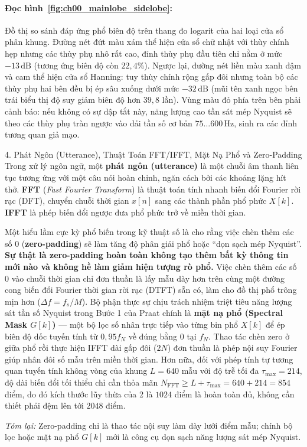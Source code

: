 \paragraph{Đọc hình~\ref{fig:ch00_mainlobe_sidelobe}:}
Đồ thị so sánh đáp ứng phổ biên độ trên thang đo logarit của hai loại cửa sổ phân khung. Đường nét đứt màu xám thể hiện cửa sổ chữ nhật với thùy chính hẹp nhưng các thùy phụ nhô rất cao, đỉnh thùy phụ đầu tiên chỉ nằm ở mức $-13\,\text{dB}$ (tương ứng biên độ còn $22{,}4\%$). Ngược lại, đường nét liền màu xanh đậm và cam thể hiện cửa sổ Hanning: tuy thùy chính rộng gấp đôi nhưng toàn bộ các thùy phụ hai bên đều bị ép sâu xuống dưới mức $-32\,\text{dB}$ (mũi tên xanh ngọc bên trái biểu thị độ suy giảm biên độ hơn $39{,}8$ lần). Vùng màu đỏ phía trên bên phải cảnh báo: nếu không có sự dập tắt này, năng lượng cao tần sát mép Nyquist sẽ theo các thùy phụ tràn ngược vào dải tần số cơ bản $75 \ldots 600\,\text{Hz}$, sinh ra các đỉnh tương quan giả mạo.

\begin{feynmanbox}{4. Phát Ngôn (Utterance), Thuật Toán FFT/IFFT, Mặt Nạ Phổ và Zero-Padding}
Trong xử lý ngôn ngữ, một \textbf{phát ngôn (utterance)} là một chuỗi âm thanh liên tục tương ứng với một câu nói hoàn chỉnh, ngăn cách bởi các khoảng lặng hít thở. \textbf{FFT} (\emph{Fast Fourier Transform}) là thuật toán tính nhanh biến đổi Fourier rời rạc (DFT), chuyển chuỗi thời gian $x[n]$ sang các thành phần phổ phức $X[k]$. \textbf{IFFT} là phép biến đổi ngược đưa phổ phức trở về miền thời gian.

Một hiểu lầm cực kỳ phổ biến trong kỹ thuật số là cho rằng việc chèn thêm các số 0 (\textbf{zero-padding}) sẽ làm tăng độ phân giải phổ hoặc ``dọn sạch mép Nyquist''. \textbf{Sự thật là zero-padding hoàn toàn không tạo thêm bất kỳ thông tin mới nào và không hề làm giảm hiện tượng rò phổ.} Việc chèn thêm các số 0 vào chuỗi thời gian chỉ đơn thuần là lấy mẫu dày hơn trên cùng một đường cong biến đổi Fourier thời gian rời rạc (DTFT) sẵn có, làm cho đồ thị phổ trông mịn hơn ($\Delta f = f_s / M$). Bộ phận thực sự chịu trách nhiệm triệt tiêu năng lượng sát tần số Nyquist trong Bước 1 của Praat chính là \textbf{mặt nạ phổ (Spectral Mask $G[k]$)} --- một bộ lọc số nhân trực tiếp vào từng bin phổ $X[k]$ để ép biên độ dốc tuyến tính từ $0{,}95 f_N$ về đúng bằng $0$ tại $f_N$. Thao tác chèn zero ở giữa phổ rồi thực hiện IFFT dài gấp đôi ($2N$) đơn thuần là phép nội suy Fourier giúp nhân đôi số mẫu trên miền thời gian. Hơn nữa, đối với phép tính tự tương quan tuyến tính không vòng của khung $L = 640$ mẫu với độ trễ tối đa $\tau_{\max} = 214$, độ dài biến đổi tối thiểu chỉ cần thỏa mãn $N_{\mathrm{FFT}} \ge L + \tau_{\max} = 640 + 214 = 854$ điểm, do đó kích thước lũy thừa của 2 là $1024$ điểm là hoàn toàn đủ, không cần thiết phải đệm lên tới $2048$ điểm.

\emph{Tóm lại:} Zero-padding chỉ là thao tác nội suy làm dày lưới điểm mẫu; chính bộ lọc hoặc mặt nạ phổ $G[k]$ mới là công cụ dọn sạch năng lượng sát mép Nyquist.
\end{feynmanbox}


